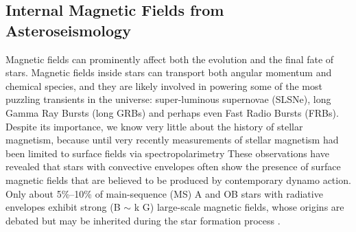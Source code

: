 \subsection{Internal Magnetic Fields from Asteroseismology}

Magnetic fields can prominently affect both the evolution and the final fate of stars. Magnetic fields inside stars can transport both angular momentum and chemical species, and they are likely involved in powering some of the most puzzling transients in the universe: super-luminous supernovae (SLSNe), long Gamma Ray Bursts (long GRBs) and perhaps even Fast Radio Bursts (FRBs). Despite its importance, we know very little about the history of stellar magnetism, because until very recently measurements of stellar magnetism had been limited to surface fields via spectropolarimetry
{\color{green} These observations have revealed that stars with convective envelopes often show the presence of surface magnetic fields that are believed to be produced by contemporary dynamo action. Only about 5\%–10\% of main-sequence (MS) A and OB stars with radiative envelopes exhibit strong (B $\sim$ k G) large-scale magnetic fields, whose origins are debated but may be inherited during the star formation process \citep[fossil fields, see e.g.,][]{2012ASPC..464..405W}.}